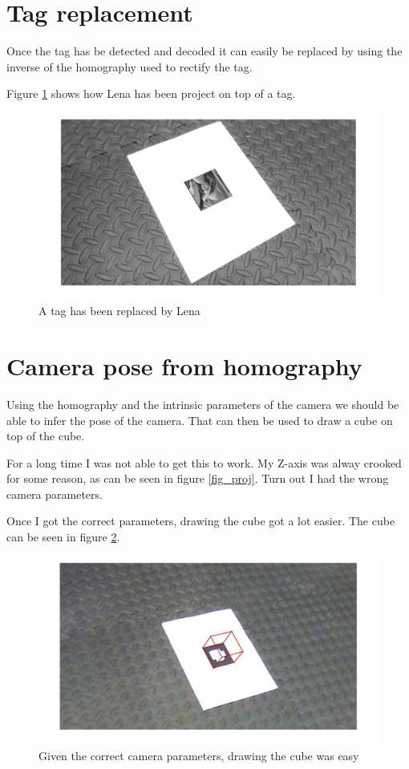 \documentclass[12pt]{article}
\begin{document}
\section{Tag replacement}

Once the tag has be detected and decoded it can easily be replaced by using the inverse of the homography used to rectify the tag.

Figure \ref{fig_lena} shows how Lena has been project on top of a tag.

\begin{figure}
    \center
    \includegraphics[width=\linewidth]{img/Lena}
    \caption{A tag has been replaced by Lena}
    \label{fig_lena}
\end{figure}


\section{Camera pose from homography}

Using the homography and the intrinsic parameters of the camera we should be able to infer the pose of the camera. That can then be used to draw a cube on top of the cube. 

For a long time I was not able to get this to work. My Z-axis was alway crooked for some reason, as can be seen in figure \ref{fig_proj}. Turn out I had the wrong camera parameters.

Once I got the correct parameters, drawing the cube got a lot easier. The cube can be seen in figure \ref{fig_cube}. 

\begin{figure}
    \center
    \includegraphics[width=\linewidth]{img/Cube}
    \caption{Given the correct camera parameters, drawing the cube was easy}
    \label{fig_cube}
\end{figure}
\end{document}
